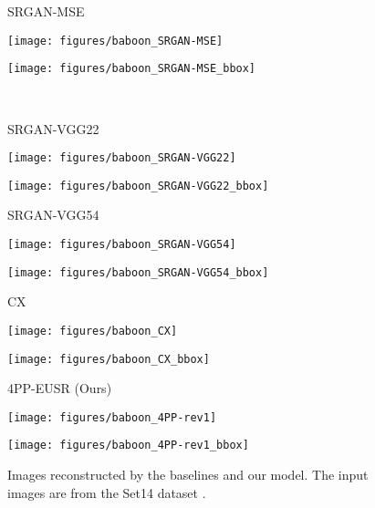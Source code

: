 \documentclass[runningheads]{llncs}
\begin{document}
\begin{figure*}[]
\begin{minipage}[b]{0.24\linewidth}
	\end{minipage}
	\begin{minipage}[b]{0.24\linewidth}
		\centering
		\centerline{\scriptsize{SRGAN-MSE}}\medskip
		\centerline{\texttt{[image: figures/baboon\_SRGAN-MSE]}}\smallskip
		\centerline{\texttt{[image: figures/baboon\_SRGAN-MSE\_bbox]}}
	\end{minipage}
	\medskip \\ \medskip
	\begin{minipage}[b]{0.24\linewidth}
		\centering
		\centerline{\scriptsize{SRGAN-VGG22}}\medskip
		\centerline{\texttt{[image: figures/baboon\_SRGAN-VGG22]}}\smallskip
		\centerline{\texttt{[image: figures/baboon\_SRGAN-VGG22\_bbox]}}
	\end{minipage}
	\begin{minipage}[b]{0.24\linewidth}
		\centering
		\centerline{\scriptsize{SRGAN-VGG54}}\medskip
		\centerline{\texttt{[image: figures/baboon\_SRGAN-VGG54]}}\smallskip
		\centerline{\texttt{[image: figures/baboon\_SRGAN-VGG54\_bbox]}}
	\end{minipage}
	\begin{minipage}[b]{0.24\linewidth}
		\centering
		\centerline{\scriptsize{CX}}\medskip
		\centerline{\texttt{[image: figures/baboon\_CX]}}\smallskip
		\centerline{\texttt{[image: figures/baboon\_CX\_bbox]}}
	\end{minipage}
	\begin{minipage}[b]{0.24\linewidth}
		\centering
		\centerline{\scriptsize{4PP-EUSR (Ours)}}\medskip
		\centerline{\texttt{[image: figures/baboon\_4PP-rev1]}}\smallskip
		\centerline{\texttt{[image: figures/baboon\_4PP-rev1\_bbox]}}
	\end{minipage}
	\caption{Images reconstructed by the baselines and our model. The input images are from the Set14 dataset \cite{zeyde2010single}.}
	\label{fig:result_baseline_comparison}
\end{figure*}
\end{document}

